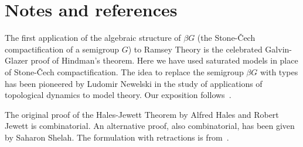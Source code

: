 \section{Notes and references}

The first application of the algebraic structure of $\beta G$ 
(the Stone-\v{C}ech compactification of a semigroup $G$) 
to Ramsey Theory is the celebrated Galvin-Glazer proof of Hindman's theorem. 
Here we have used saturated models in place of Stone-\v{C}ech compactification.
The idea to replace the semigroup $\beta G$ with types has been pioneered by Ludomir Newelski
in the study of applications of topological dynamics to model theory.
Our exposition follows~\cite{CZ}.

The original proof of the Hales-Jewett Theorem by Alfred Hales and Robert Jewett is combinatorial.
An alternative proof, also combinatorial, has been given by Saharon Shelah.
The formulation with retractions is from~\cite{Koppelberg}.

\begin{biblist}[]\normalsize
  \smallskip
  \end{biblist}

